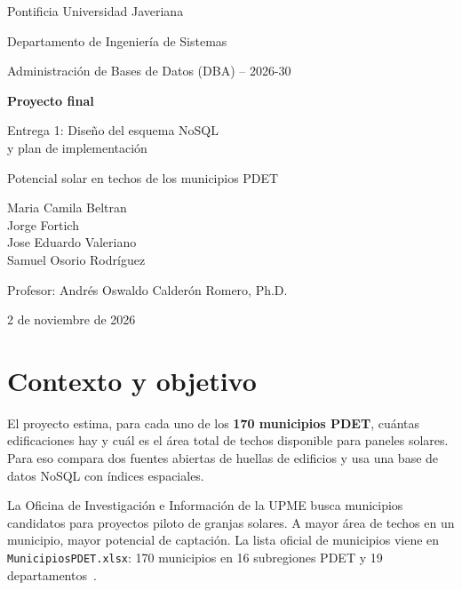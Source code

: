 \documentclass[11pt,a4paper]{article}
\newcommand{\campo}[1]{\texttt{#1}}
\begin{document}
\begin{titlepage}
  \centering
  {\large Pontificia Universidad Javeriana\par}
  {\large Departamento de Ingeniería de Sistemas\par}
  \vspace{0.4cm}
  {\large Administración de Bases de Datos (DBA) -- 2026-30\par}
  \vspace{3cm}
  {\Huge\bfseries Proyecto final\par}
  \vspace{0.4cm}
  {\LARGE Entrega 1: Diseño del esquema NoSQL\\ y plan de implementación\par}
  \vspace{0.8cm}
  {\large Potencial solar en techos de los municipios PDET\par}
  \vfill
  {\large
    Maria Camila Beltran \\
    Jorge Fortich \\
    Jose Eduardo Valeriano \\
    Samuel Osorio Rodríguez\par}
  \vspace{1cm}
  {\large Profesor: Andrés Oswaldo Calderón Romero, Ph.D.\par}
  \vspace{0.4cm}
  {\large 2 de noviembre de 2026\par}
\end{titlepage}

\tableofcontents
\newpage

\section{Contexto y objetivo}
\label{sec:contexto}

El proyecto estima, para cada uno de los \textbf{170 municipios PDET}, cuántas
edificaciones hay y cuál es el área total de techos disponible para paneles
solares. Para eso compara dos fuentes abiertas de huellas de edificios y usa
una base de datos NoSQL con índices espaciales.

La Oficina de Investigación e Información de la UPME busca municipios
candidatos para proyectos piloto de granjas solares. A mayor
área de techos en un municipio, mayor potencial de captación. La lista oficial
de municipios viene en \campo{MunicipiosPDET.xlsx}: 170 municipios en 16
subregiones PDET y 19 departamentos~\cite{pdet}.
\end{document}
